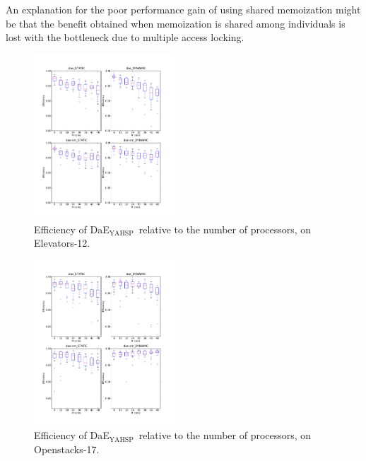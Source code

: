 \documentclass{sig-alternate}
\newcommand{\DAEYAHSP}{{\sc DaE$_{\text{YAHSP}}$}}
\newcommand{\OPENSTACKS}{{\sc Openstacks}}
\newcommand{\ELEVATORS}{{\sc Elevators}}
\begin{document}
An explanation for the poor performance gain of using shared memoization might
be that the benefit obtained when memoization is shared among individuals is
lost with the bottleneck due to multiple access locking.

\begin{figure}[H]
\begin{center}
\includegraphics[width=0.47\textwidth]{images/EXP2_Efficiency_IPC6_SEQ_ELEVATORS_12_S96.pdf}
\caption{Efficiency of \DAEYAHSP\ relative to the number of processors, on \ELEVATORS-12.}
\label{fig:exp2_efficiency_core_elevators_12_pop_96}
\end{center}
\end{figure}

\begin{figure}[H]
\begin{center}
\includegraphics[width=0.47\textwidth]{images/EXP2_Efficiency_IPC6_TEMPO_OPENSTACKS_17_S96.pdf}
\caption{Efficiency of \DAEYAHSP\ relative to the number of processors, on \OPENSTACKS-17.}
\label{fig:exp2_efficiency_core_openstacks_17_pop_96}
\end{center}
\end{figure}
\end{document}
